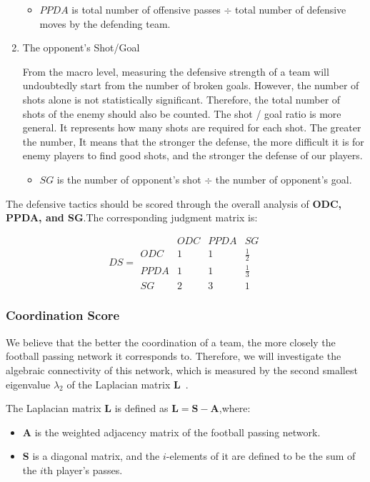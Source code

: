 \documentclass{mcmthesis}
\begin{document}
\begin{enumerate}
	\begin{itemize}
		\item $PPDA$ is total number of offensive passes $\div$ total number of defensive moves by the defending team.
	\end{itemize}

	\item The opponent's Shot/Goal
	
	\qquad From the macro level, measuring the defensive strength of a team will undoubtedly start from the number of broken goals.  However, the number of shots alone is not statistically significant. Therefore, the total number of shots of the enemy should also be counted. The shot / goal ratio is more general. It represents how many shots are required for each shot. The greater the number,  It means that the stronger the defense, the more difficult it is for enemy players to find good shots, and the stronger the defense of our players.

	\begin{itemize}
		\item $SG$ is the number of opponent's shot $\div$ the number of opponent's goal.
	\end{itemize}
	\end{enumerate}
	
	The defensive tactics should be scored through the overall analysis of \textbf{ODC, PPDA, and SG}.The corresponding judgment matrix is:

	\begin{equation}\label{mat:3}
		DS=
	  \begin{matrix}
		& ODC & PPDA & SG\\
   		ODC & 1 & 1 & \frac{1}{2} \\
   		PPDA & 1 & 1 & \frac{1}{3} \\
   		SG & 2 & 3 & 1
  	\end{matrix}
	\end{equation}

\subsubsection{Coordination Score}
	 We believe that the better the coordination of a team, the more closely the football passing network it corresponds to.  Therefore, we will investigate the algebraic connectivity of this network, which is measured by the second smallest eigenvalue $\lambda_{2}$ of the Laplacian matrix $\textbf{L}$~\cite{First}.

	The Laplacian matrix $\textbf{L}$ is defined as $\textbf{L}=\textbf{S}-\textbf{A}$,where:
	\begin{itemize}
	\item \textbf{A} is the weighted adjacency matrix of the football passing network.
	\item \textbf{S} is a diagonal matrix, and the $i$-elements of it are defined to be the sum of the $i$th player's passes.
	\end{itemize}
\end{document}

